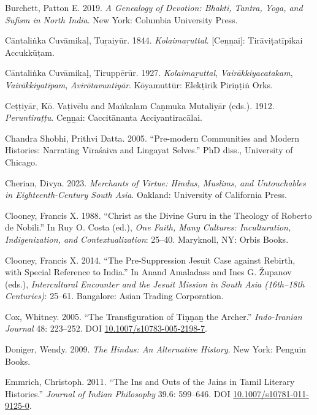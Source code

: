 \begin{hangparas}{0.125in}{1}
	\label{Burchett2019}Burchett, Patton E. 2019. \emph{A Genealogy of Devotion: Bhakti, Tantra, Yoga, and Sufism in North India}. New York: Columbia University Press.\medskip


	\label{CantalinkaCuvamikal1844}Cāntaliṅka Cuvāmikaḷ, Tuṟaiyūr. 1844. \emph{{Kolaimaṟuttal}}. [Ceṉṉai]: Tirāviṭatīpikai Accukkūṭam.\medskip


	\label{CantalinkaCuvamikal1927}Cāntaliṅka Cuvāmikaḷ, Tiruppērūr. 1927. \emph{{Kolaimaṟuttal}}, \emph{{Vairākkiyacatakam}}, \emph{{Vairākkiyatīpam}}, \emph{{Avirōtavuntiyār}}. Kōyamuttūr: Elekṭirik Piriṇṭiṅ Orks.\medskip


	\label{Cettiar1912}Ceṭṭiyār, Kō. Vaṭivēlu and Maṅkalam Caṇmuka Mutaliyār (eds.). 1912. \emph{{Peruntiraṭṭu}}. Ceṉṉai: Caccitānanta Acciyantiracālai.\medskip


	\label{ChandraShobhi2005}Chandra Shobhi, Prithvi Datta. 2005. “Pre-modern Communities and Modern Histories: Narrating Vīraśaiva and Lingayat Selves.” PhD diss., University of Chicago.\medskip


	\label{Cherian2023}Cherian, Divya. 2023. \emph{Merchants of Virtue: Hindus, Muslims, and Untouchables in Eighteenth-Century South Asia}. Oakland: University of California Press.\medskip


	\label{Clooney1998}Clooney, Francis X. 1988. “Christ as the Divine Guru in the Theology of Roberto de Nobili.” In Ruy O. Costa (ed.), \emph{One Faith, Many Cultures: Inculturation, Indigenization, and Contextualization}: 25–40. Maryknoll, NY: Orbis Books.\medskip


	\label{Clooney2014}Clooney, Francis X. 2014. “The Pre-Suppression Jesuit Case against Rebirth, with Special Reference to India.” In Anand Amaladass and Ines G. Županov (eds.), \emph{Intercultural Encounter and the Jesuit Mission in South Asia (16th–18th Centuries)}: 25–61. Bangalore: Asian Trading Corporation.\medskip


	\label{Cox2005}Cox, Whitney. 2005. “The Transfiguration of Tiṇṇaṉ the Archer.” \emph{Indo-Iranian Journal} 48: 223–252. DOI \href{http://doi.org/10.1007/s10783-005-2198-7}{10.1007/s10783-005-2198-7}.\medskip


	\label{Doniger2009}Doniger, Wendy. 2009. \emph{The Hindus: An Alternative History}. New York: Penguin Books.\medskip


	\label{Emmrich2011}Emmrich, Christoph. 2011. “The Ins and Outs of the Jains in Tamil Literary Histories.” \emph{Journal of Indian Philosophy} 39.6: 599–646. DOI \href{https://doi.org/10.1007/s10781-011-9125-0}{10.1007/s10781-011-9125-0}.\medskip



\end{hangparas}
